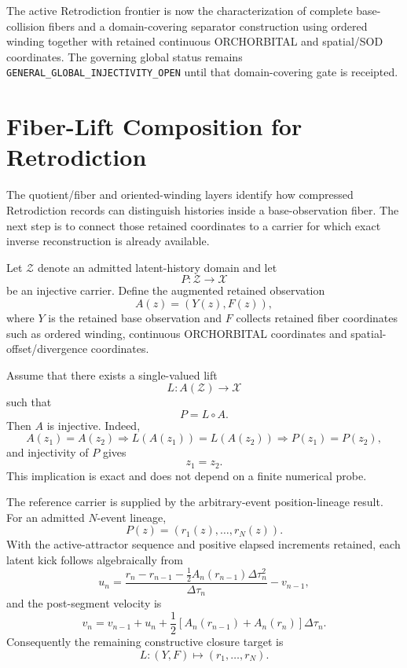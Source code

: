 The active Retrodiction frontier is now the characterization of complete base-collision fibers and a domain-covering separator construction using ordered winding together with retained continuous ORCHORBITAL and spatial/SOD coordinates.  The governing global status remains \texttt{GENERAL\_GLOBAL\_INJECTIVITY\_OPEN} until that domain-covering gate is receipted.


\chapter{Fiber-Lift Composition for Retrodiction}
\label{chap:fiber-lift-composition}

The quotient/fiber and oriented-winding layers identify how compressed Retrodiction records can distinguish histories inside a base-observation fiber.  The next step is to connect those retained coordinates to a carrier for which exact inverse reconstruction is already available.

Let \(\mathcal Z\) denote an admitted latent-history domain and let
\[
P:\mathcal Z\to\mathcal X
\]
be an injective carrier.  Define the augmented retained observation
\[
\boxed{A(z)=(Y(z),F(z)),}
\]
where \(Y\) is the retained base observation and \(F\) collects retained fiber coordinates such as ordered winding, continuous ORCHORBITAL coordinates and spatial-offset/divergence coordinates.

Assume that there exists a single-valued lift
\[
L:A(\mathcal Z)\to\mathcal X
\]
such that
\[
\boxed{P=L\circ A.}
\]
Then \(A\) is injective.  Indeed,
\[
A(z_1)=A(z_2)
\Longrightarrow
L(A(z_1))=L(A(z_2))
\Longrightarrow
P(z_1)=P(z_2),
\]
and injectivity of \(P\) gives
\[
\boxed{z_1=z_2.}
\]
This implication is exact and does not depend on a finite numerical probe.

The reference carrier is supplied by the arbitrary-event position-lineage result.  For an admitted \(N\)-event lineage,
\[
\boxed{P(z)=(r_1(z),\ldots,r_N(z)).}
\]
With the active-attractor sequence and positive elapsed increments retained, each latent kick follows algebraically from
\[
\boxed{
u_n=
\frac{r_n-r_{n-1}-\frac12A_n(r_{n-1})\Delta\tau_n^2}
{\Delta\tau_n}
-v_{n-1},}
\]
and the post-segment velocity is
\[
\boxed{
v_n=v_{n-1}+u_n+
\frac12\left[A_n(r_{n-1})+A_n(r_n)\right]\Delta\tau_n.}
\]
Consequently the remaining constructive closure target is
\[
\boxed{
L:(Y,F)\mapsto(r_1,\ldots,r_N).
}
\]

